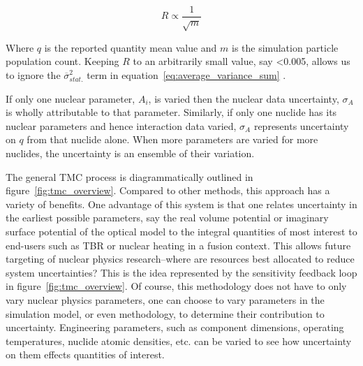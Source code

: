 \begin{equation}
  \label{eq:rsd_m}
  R \propto \frac{1}{\sqrt{m}}
\end{equation}

Where $q$ is the reported quantity mean value and $m$ is the simulation particle population count. Keeping $R$ to an arbitrarily small value, say <0.005, allows us to ignore the $\overline{\sigma}_{stat.}^{2}$ term in equation~\ref{eq:average_variance_sum} \cite{Rochman2014a}.

If only one nuclear parameter, $A_{i}$, is varied then the nuclear data uncertainty, $\sigma_{A}$ is wholly attributable to that parameter. Similarly, if only one nuclide has its nuclear parameters and hence interaction data varied, $\sigma_{A}$ represents uncertainty on $q$ from that nuclide alone. When more parameters are varied for more nuclides, the uncertainty is an ensemble of their variation. 


The general TMC process is diagrammatically outlined in figure~\ref{fig:tmc_overview}. Compared to other methods, this approach has a variety of benefits. One advantage of this system is that one relates uncertainty in the earliest possible parameters, say the real volume potential or imaginary surface potential of the optical model to the integral quantities of most interest to end-users such as TBR or nuclear heating in a fusion context. This allows future targeting of nuclear physics research--where are resources best allocated to reduce system uncertainties? This is the idea represented by the sensitivity feedback loop in figure~\ref{fig:tmc_overview}. Of course, this methodology does not have to only vary nuclear physics parameters, one can choose to vary parameters in the simulation model, or even methodology, to determine their contribution to uncertainty. Engineering parameters, such as component dimensions, operating temperatures, nuclide atomic densities, etc. can be varied to see how uncertainty on them effects quantities of interest.

